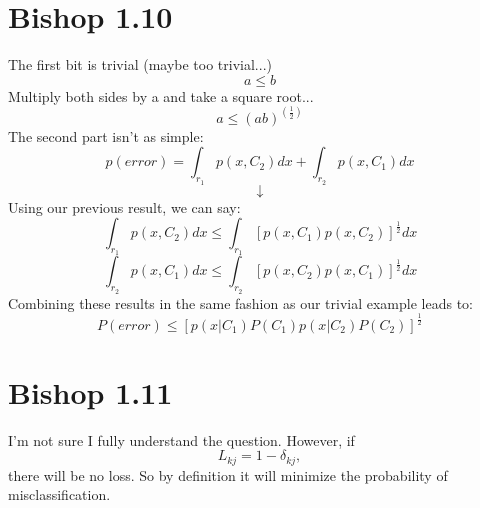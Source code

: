 \documentclass[12pt, letterpaper]{article}
\begin{document}
\section{Bishop 1.10}
The first bit is trivial (maybe too trivial...)
\begin{equation}
a \leq b 
\end{equation}
Multiply both sides by a and take a square root...
\begin{equation}
a \leq (a b)^{(\frac{1}{2})}
\end{equation}
The second part isn't as simple:
\begin{equation}
p(error) = \int_{r_1} p(x, C_2) dx + \int_{r_2} p(x, C_1) dx
\end{equation}
\begin{equation}
\downarrow
\end{equation}
Using our previous result, we can say:
\begin{equation}
\int_{r_1} p(x, C_2) dx \leq \int_{r_1} [ p(x, C_1) p(x, C_2)]^{\frac{1}{2}} dx
\end{equation}
\begin{equation}
\int_{r_2} p(x, C_1) dx \leq \int_{r_2} [ p(x, C_2) p(x, C_1)]^{\frac{1}{2}} dx
\end{equation}
Combining these results in the same fashion as our trivial example leads to:
\begin{equation}
P(error) \leq [p(x|C_1) P(C_1) p(x|C_2) P(C_2)]^{\frac{1}{2}}
\end{equation}

\section*{Bishop 1.11}
I'm not sure I fully understand the question. However, if 
\begin{equation}
L_{k j} = 1 - \delta_{k j}, 
\end{equation}
there will be no loss. So by definition it will minimize the probability of misclassification.
\end{document}
